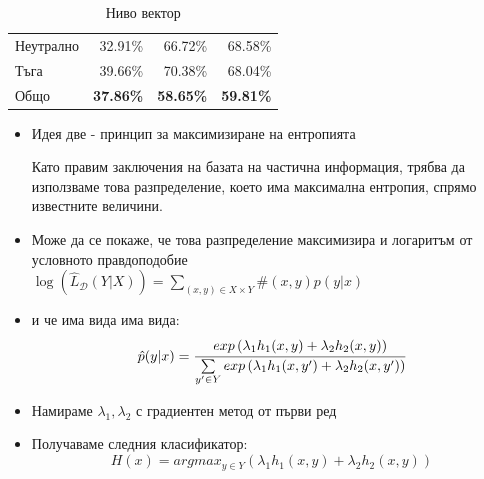 \documentclass[9pt]{beamer}
\newcommand{\B}[1]{\left(#1\right)}
\begin{document}
\begin{frame}[t]
\begin{table}[h]
\begin{center}
{\begin{tabular}{|l|r r r|}
                    Неутрално & 32.91\%           & 66.72\%          & 68.58\%          \\
                    Тъга      & 39.66\%          & 70.38\%          & 68.04\%          \\
                    \hline
                    \hline
                    Общо      & \textbf{37.86\%} & \textbf{58.65\%} & \textbf{59.81\%} \\
                    \hline
                \end{tabular}}
                \caption*{Ниво вектор}
            \end{center}
        \end{table}
    \end{frame}

    \begin{frame}[t]
        \begin{itemize}
            \setlength\itemsep{\fill}
            \item Идея две
            \pause - принцип за максимизиране на ентропията
            
            \pause Като правим заключения на базата на частична информация, трябва да използваме това разпределение, което има максимална ентропия, спрямо известните величини.
            \pause 
            \item Може да се покаже, че това разпределение максимизира и логаритъм от условното правдоподобие
            \pause $\log\B{\widehat{L}_{\mathcal{D}}(Y|X)} = \sum\limits_{(x, y) \in X\times Y} \#(x, y) p(y|x)$
            \pause
            \item и че има вида има вида:
            \pause
            \[\hat{p}(y|x) = \cfrac{exp\B{\lambda_1 h_1(x, y) + \lambda_2 h_2(x, y)}}{\sum\limits_{y' \in Y} exp\B{\lambda_1 h_1(x, y') + \lambda_2 h_2(x, y')} }\]
            \pause
            \item Намираме $\lambda_1, \lambda_2$ с градиентен метод от първи ред
            \pause
            \item Получаваме следния класификатор:
            \pause \[H(x) = argmax_{y\in Y} \B{\lambda_1 h_1(x, y) + \lambda_2 h_2(x, y)}\]
        \end{itemize}
    \end{frame}
\end{document}
